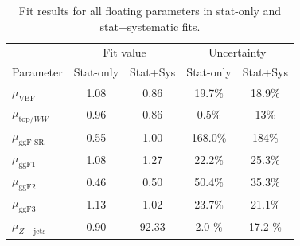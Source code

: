 \begin{table}[!h]
  \begin{center}
    \begin{tabular}{l|c|c|c|c|}
        & \multicolumn{2}{|c|}{Fit value} & \multicolumn{2}{|c|}{Uncertainty} \\
       Parameter & Stat-only & Stat+Sys & Stat-only & Stat+Sys \\
      \hline
       $\mu_{\text{VBF}}$ & 1.08 & 0.86 & 19.7$\%$ & 18.9$\%$ \\
       $\mu_{\text{top/}WW}$ & 0.96 & 0.86 & 0.5$\%$ & 13$\%$ \\
       $\mu_{\text{ggF-SR}}$ & 0.55 & 1.00 & 168.0$\%$ & 184$\%$ \\
       $\mu_{\text{ggF1}}$ & 1.08 & 1.27 & 22.2$\%$ & 25.3$\%$ \\
       $\mu_{\text{ggF2}}$ & 0.46 & 0.50 & 50.4$\%$ & 35.3$\%$ \\
       $\mu_{\text{ggF3}}$ & 1.13 & 1.02 & 23.7$\%$ & 21.1$\%$ \\
       $\mu_{Z+\text{jets}}$& 0.90 & 92.33 & 2.0 $\%$ & 17.2 $\%$ \\
    \end{tabular}
    \caption{Fit results for all floating parameters in stat-only and stat+systematic fits.}
    \label{tab:datamuresults}
  \end{center}
\end{table}
%


